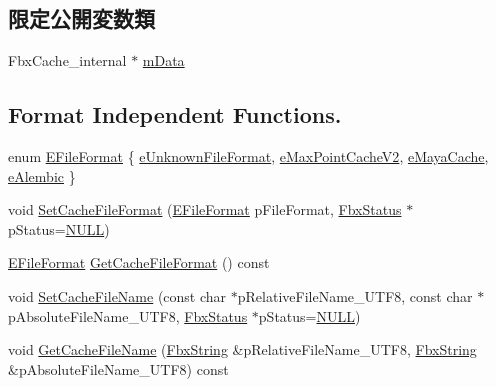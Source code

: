 \subsection*{限定公開変数類}
\begin{DoxyCompactItemize}
\item 
Fbx\+Cache\+\_\+internal $\ast$ \hyperlink{class_fbx_cache_aa06daa79fd67613e9bfc1811f4fd84e8}{m\+Data}
\end{DoxyCompactItemize}
\subsection*{Format Independent Functions.}
\begin{DoxyCompactItemize}
\item 
enum \hyperlink{class_fbx_cache_ab8202edfb74969539e92a4d1734df3e7}{E\+File\+Format} \{ \hyperlink{class_fbx_cache_ab8202edfb74969539e92a4d1734df3e7a0a10dbb146bdcf65a3ac98a03b3b4e48}{e\+Unknown\+File\+Format}, 
\hyperlink{class_fbx_cache_ab8202edfb74969539e92a4d1734df3e7a8ea5aa8db1a5a30035f4bb1bee8ff3a7}{e\+Max\+Point\+Cache\+V2}, 
\hyperlink{class_fbx_cache_ab8202edfb74969539e92a4d1734df3e7a71f041c2c787346355e8ced9c3f29127}{e\+Maya\+Cache}, 
\hyperlink{class_fbx_cache_ab8202edfb74969539e92a4d1734df3e7a1d9f43b0ddf3da5ec418c50f1d1b5549}{e\+Alembic}
 \}
\item 
void \hyperlink{class_fbx_cache_a334522b228cbf7b5eb488e15606bf622}{Set\+Cache\+File\+Format} (\hyperlink{class_fbx_cache_ab8202edfb74969539e92a4d1734df3e7}{E\+File\+Format} p\+File\+Format, \hyperlink{class_fbx_status}{Fbx\+Status} $\ast$p\+Status=\hyperlink{fbxarch_8h_a070d2ce7b6bb7e5c05602aa8c308d0c4}{N\+U\+LL})
\item 
\hyperlink{class_fbx_cache_ab8202edfb74969539e92a4d1734df3e7}{E\+File\+Format} \hyperlink{class_fbx_cache_adabf432059b20e05cda5f3ddfab8f767}{Get\+Cache\+File\+Format} () const
\item 
void \hyperlink{class_fbx_cache_a4adc82174046fe9bce5b0a415b6e6963}{Set\+Cache\+File\+Name} (const char $\ast$p\+Relative\+File\+Name\+\_\+\+U\+T\+F8, const char $\ast$p\+Absolute\+File\+Name\+\_\+\+U\+T\+F8, \hyperlink{class_fbx_status}{Fbx\+Status} $\ast$p\+Status=\hyperlink{fbxarch_8h_a070d2ce7b6bb7e5c05602aa8c308d0c4}{N\+U\+LL})
\item 
void \hyperlink{class_fbx_cache_af1eb7de2d7a8ccb387d37f1c6da55c51}{Get\+Cache\+File\+Name} (\hyperlink{class_fbx_string}{Fbx\+String} \&p\+Relative\+File\+Name\+\_\+\+U\+T\+F8, \hyperlink{class_fbx_string}{Fbx\+String} \&p\+Absolute\+File\+Name\+\_\+\+U\+T\+F8) const

\end{DoxyCompactItemize}

